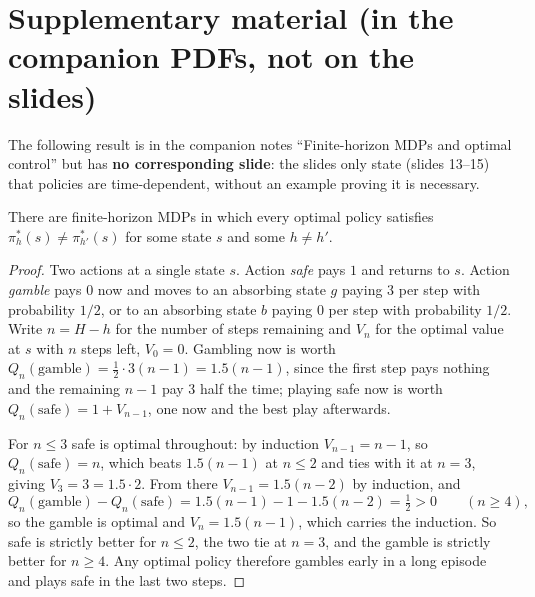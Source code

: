 \documentclass[11pt,a4paper]{article}
\theoremstyle{plain}
\theoremstyle{definition}
\theoremstyle{remark}
\begin{document}
\appendix
\section{Supplementary material (in the companion PDFs, not on the slides)}\label{app:supp}

The following result is in the companion notes ``Finite-horizon MDPs and optimal control'' but has \textbf{no corresponding slide}: the slides only state (slides 13--15) that policies are time-dependent, without an example proving it is necessary.

\begin{proposition}\label{prop:timedep}
There are finite-horizon MDPs in which every optimal policy satisfies $\pi^*_h(s)\ne\pi^*_{h'}(s)$ for some state $s$ and some $h\ne h'$.
\end{proposition}
\begin{proof}
Two actions at a single state $s$. Action \emph{safe} pays $1$ and returns to $s$. Action \emph{gamble} pays $0$ now and moves to an absorbing state $g$ paying $3$ per step with probability $1/2$, or to an absorbing state $b$ paying $0$ per step with probability $1/2$. Write $n=H-h$ for the number of steps remaining and $V_n$ for the optimal value at $s$ with $n$ steps left, $V_0=0$. Gambling now is worth $Q_n(\text{gamble})=\tfrac12\cdot3(n-1)=1.5(n-1)$, since the first step pays nothing and the remaining $n-1$ pay $3$ half the time; playing safe now is worth $Q_n(\text{safe})=1+V_{n-1}$, one now and the best play afterwards.

For $n\le3$ safe is optimal throughout: by induction $V_{n-1}=n-1$, so $Q_n(\text{safe})=n$, which beats $1.5(n-1)$ at $n\le2$ and ties with it at $n=3$, giving $V_3=3=1.5\cdot2$. From there $V_{n-1}=1.5(n-2)$ by induction, and
\[
Q_n(\text{gamble})-Q_n(\text{safe})=1.5(n-1)-1-1.5(n-2)=\tfrac12>0\qquad(n\ge4),
\]
so the gamble is optimal and $V_n=1.5(n-1)$, which carries the induction. So safe is strictly better for $n\le2$, the two tie at $n=3$, and the gamble is strictly better for $n\ge4$. Any optimal policy therefore gambles early in a long episode and plays safe in the last two steps.
\end{proof}
\end{document}
